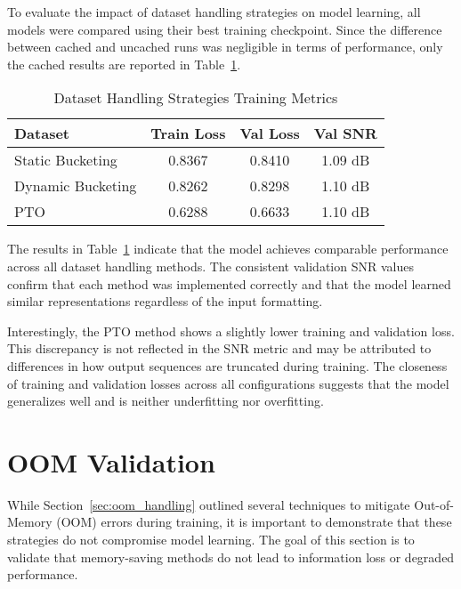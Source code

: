 To evaluate the impact of dataset handling strategies on model learning, all models were compared using their best training checkpoint. Since the difference between cached and uncached runs was negligible in terms of performance, only the cached results are reported in Table~\ref{tab:dataset_performance}.

\vspace{1em}
\begin{table}[H]
\centering
\caption{Dataset Handling Strategies Training Metrics}
\label{tab:dataset_performance}
\begin{tabular}{|l|c|c|c|}
\hline
\textbf{Dataset} & \textbf{Train Loss} & \textbf{Val Loss} & \textbf{Val SNR} \\
\hline
Static Bucketing  & 0.8367  & 0.8410  & 1.09 dB \\
Dynamic Bucketing & 0.8262  & 0.8298  & 1.10 dB \\  
PTO               & 0.6288  & 0.6633  & 1.10 dB \\
\hline
\end{tabular}
\end{table}

The results in Table~\ref{tab:dataset_performance} indicate that the model achieves comparable performance across all dataset handling methods. The consistent validation SNR values confirm that each method was implemented correctly and that the model learned similar representations regardless of the input formatting.

Interestingly, the PTO method shows a slightly lower training and validation loss. This discrepancy is not reflected in the SNR metric and may be attributed to differences in how output sequences are truncated during training. The closeness of training and validation losses across all configurations suggests that the model generalizes well and is neither underfitting nor overfitting.


\section{OOM Validation}
\label{sec:oom_validation}

While Section~\ref{sec:oom_handling} outlined several techniques to mitigate Out-of-Memory (OOM) errors during training, it is important to demonstrate that these strategies do not compromise model learning. The goal of this section is to validate that memory-saving methods do not lead to information loss or degraded performance.

